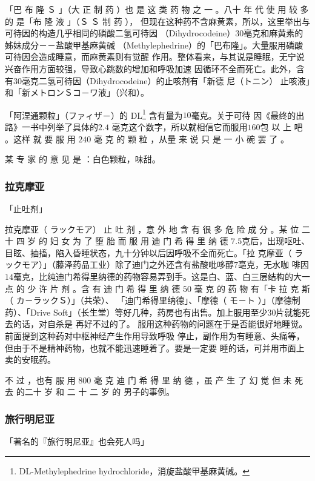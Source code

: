 \documentclass[UTF8]{ctexart}
\begin{document}
「巴 布 隆 Ｓ 」（大 正 制 药 ）也 是 这 类 药 物 之 一 。八十 年 代 使 用 较 多 的 是「布 隆 液 」（Ｓ Ｓ 制 药 ），
但现在这种药不含麻黄素，所以，这里举出与可待因的构造几乎相同的磷酸二氢可待因
（Dihydrocodeine）$30$亳克和麻黄素的姊妹成分－－盐酸甲基麻黄碱
（Methylephedrine）的「巴布隆」。大量服用磷酸可待因会造成睡意，而麻黄素则有觉醒
作用。整体看来，与其说是睡眠，无宁说兴奋作用方面较强，导致心跳数的增加和呼吸加速
因循环不全而死亡。此外，含有$30$毫克二氢可待因（Dihydrocodeine）的止咳剂有「新德
尼（トニン）
止咳液」和「新メトロンＳコ－ワ液」（兴和）。

「阿涅通颗粒」（ファィザ－）的 DL\footnote{DL-Methylephedrine hydrochloride，消旋盐酸甲基麻黄碱。} 含有量为$10$毫克。关于可待 因《最终的出路》一书中列举了具体的$2.4$ 毫克这个数字，所以就相信它而服用$160$包 以 上 吧 。这样 就 要 服 用 $240$ 毫 克 的 颗 粒 ，从量 来 说 只 是 一 小 碗 罢 了 。

某 专 家 的 意 见 是 ：白色颗粒，味甜。

\subsubsection{拉克摩亚}
\begin{flushright}
「止吐剂」
\end{flushright}

拉克摩亚（ ラックモア） 止 吐 剂 ，意 外 地 含 有 很 多 危 险 成 分 。某 位 二 十 四 岁 的 妇 女 为 了 堕 胎 而 服 用 迪 门 希 得 里 纳 德 $7.5$克后，出现呕吐、目眩、抽搐，陷入昏睡状态，九十分钟以后因呼吸不全而死亡。「拉 克摩亚（ ラックモア）」（藤泽药品工业）除了迪门之外还含有盐酸吡哆醇$7$亳克，无水咖 啡因$14$毫克，比纯迪门希得里纳德的药物容易弄到手。这是白、蓝、白三层结构的大一点 的 少 许 片 剂 。含 有 迪 门 希 得 里 纳 德 $50$ 毫 克 的 药 物 有「卡 拉 克 斯（ カ－ラックＳ）」（共荣）、 「迪门希得里纳德」、「摩德（ モ－ト ）」（摩德制药）、「Drive Soft」（长生堂）等好几种，药房也有出售。加上服用至少$30$片就能死去的话，对自杀是
再好不过的了。
服用这种药物的问题在于是否能很好地睡觉。前面提到这种药对中枢神经产生作用导致呼吸
停止，副作用为有睡意、头痛等，但由于不是精神药物，也就不能迅速睡着了。要是一定要
睡的话，可并用市面上卖的安眠药。

不 过 ，也有 服 用 $800$ 毫 克 迪 门 希 得 里 纳 德 ，虽 产 生 了 幻 觉 但 未 死 去 的二十 岁 和 二 十 二 岁 的 男子的事例。 

\subsubsection{旅行明尼亚}
\begin{flushright}
「著名的『旅行明尼亚』也会死人吗」
\end{flushright}
\end{document}
